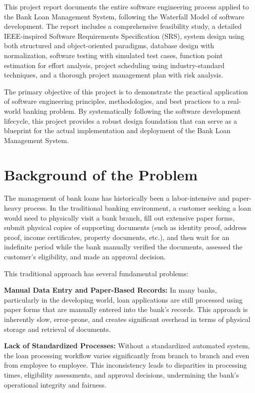 \documentclass[12pt,a4paper,oneside]{report}
\begin{document}
This project report documents the entire software engineering process applied to the Bank Loan Management System, following the Waterfall Model of software development. The report includes a comprehensive feasibility study, a detailed IEEE-inspired Software Requirements Specification (SRS), system design using both structured and object-oriented paradigms, database design with normalization, software testing with simulated test cases, function point estimation for effort analysis, project scheduling using industry-standard techniques, and a thorough project management plan with risk analysis.

The primary objective of this project is to demonstrate the practical application of software engineering principles, methodologies, and best practices to a real-world banking problem. By systematically following the software development lifecycle, this project provides a robust design foundation that can serve as a blueprint for the actual implementation and deployment of the Bank Loan Management System.

\section{Background of the Problem}

The management of bank loans has historically been a labor-intensive and paper-heavy process. In the traditional banking environment, a customer seeking a loan would need to physically visit a bank branch, fill out extensive paper forms, submit physical copies of supporting documents (such as identity proof, address proof, income certificates, property documents, etc.), and then wait for an indefinite period while the bank manually verified the documents, assessed the customer's eligibility, and made an approval decision.

This traditional approach has several fundamental problems:

\textbf{Manual Data Entry and Paper-Based Records:} In many banks, particularly in the developing world, loan applications are still processed using paper forms that are manually entered into the bank's records. This approach is inherently slow, error-prone, and creates significant overhead in terms of physical storage and retrieval of documents.

\textbf{Lack of Standardized Processes:} Without a standardized automated system, the loan processing workflow varies significantly from branch to branch and even from employee to employee. This inconsistency leads to disparities in processing times, eligibility assessments, and approval decisions, undermining the bank's operational integrity and fairness.
\end{document}
